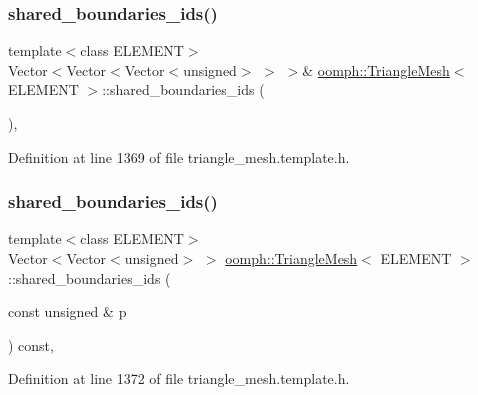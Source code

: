 \subsubsection{\texorpdfstring{shared\+\_\+boundaries\+\_\+ids()}{shared\_boundaries\_ids()}\hspace{0.1cm}{\footnotesize\ttfamily [2/7]}}
{\footnotesize\ttfamily template$<$class E\+L\+E\+M\+E\+NT$>$ \\
Vector$<$Vector$<$Vector$<$unsigned$>$ $>$ $>$\& \hyperlink{classoomph_1_1TriangleMesh}{oomph\+::\+Triangle\+Mesh}$<$ E\+L\+E\+M\+E\+NT $>$\+::shared\+\_\+boundaries\+\_\+ids (\begin{DoxyParamCaption}{ }\end{DoxyParamCaption})\hspace{0.3cm}{\ttfamily [inline]}, {\ttfamily [protected]}}



Definition at line 1369 of file triangle\+\_\+mesh.\+template.\+h.

\mbox{\label{classoomph_1_1TriangleMesh_a399b49dae233992723e710e8c7e06992}} 
\subsubsection{\texorpdfstring{shared\+\_\+boundaries\+\_\+ids()}{shared\_boundaries\_ids()}\hspace{0.1cm}{\footnotesize\ttfamily [3/7]}}
{\footnotesize\ttfamily template$<$class E\+L\+E\+M\+E\+NT$>$ \\
Vector$<$Vector$<$unsigned$>$ $>$ \hyperlink{classoomph_1_1TriangleMesh}{oomph\+::\+Triangle\+Mesh}$<$ E\+L\+E\+M\+E\+NT $>$\+::shared\+\_\+boundaries\+\_\+ids (\begin{DoxyParamCaption}\item[{const unsigned \&}]{p }\end{DoxyParamCaption}) const\hspace{0.3cm}{\ttfamily [inline]}, {\ttfamily [protected]}}



Definition at line 1372 of file triangle\+\_\+mesh.\+template.\+h.

\mbox{\label{classoomph_1_1TriangleMesh_a582bf4ae8707a1eee837979be493ab2b}} 
